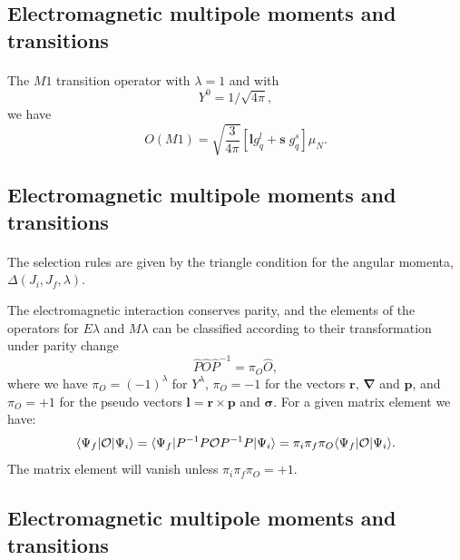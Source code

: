 \documentclass[%
oneside,                 %
final,                   %
10pt]{article}
\begin{document}
\subsection{Electromagnetic multipole moments and transitions}

\paragraph{}
The $M1$ transition operator with $\lambda=1$ and with
\[
  Y^{0}=1/\sqrt{4\pi },
\]
we have
\[
O(M1)=\sqrt{\frac{3}{4\pi }}[\mathbf{l}g^{l }_{q}+\mathbf{s} \; g^{s}_{q}]\mu _{N}. 
\]



\subsection{Electromagnetic multipole moments and transitions}

\paragraph{}
The selection rules are given by the triangle condition for the
angular momenta, $\Delta(J_{i},J_{f},\lambda)$. 

The electromagnetic
interaction conserves parity, and the elements of the
operators for $E\lambda$ and $M\lambda$
can be classified according to their transformation under parity
change
\[
\hat{P}\hat{O}\hat{P}^{-1}=\pi_{O}\hat{O}, 
\]
where we have $\pi _{O}=(-1)^{\lambda }$ for $Y^{\lambda }$,
$\pi _{O}=-1$ for the vectors
$\mathbf{r}$, $\mathbf{\nabla}$ and $\mathbf{p}$, and $\pi _{O}=+1$ for the 
pseudo vectors
$\mathbf{l}=\mathbf{r}\times\mathbf{p}$ and $\mathbf{\sigma}$. For a given matrix element we have:
\[
\langle\Psi _{f}\vert {\cal O}\vert \Psi _{i}\rangle =\langle\Psi _{f}\vert P^{-1}P{\cal O}P^{-1}P\vert \Psi _{i}\rangle=\pi _{i}\pi _{f}\pi _{O} \langle\Psi _{f}\vert {\cal O}\vert \Psi _{i}\rangle. 
\]
The matrix element will vanish unless  $\pi _{i}\pi _{f}\pi _{O}=+1$.



\subsection{Electromagnetic multipole moments and transitions}

\end{document}
